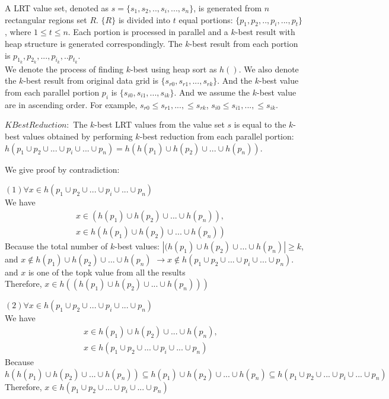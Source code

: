 \documentclass[AMA,LATO1COL]{WileyNJD-v2}
\begin{document}
A LRT value set, denoted as $s=\{s_1,s_2, .., s_i,...,s_n\}$, is generated from $n$ rectangular regions set ${R}$. $\{R\}$ is divided into $t$ equal portions: $\{p_1,p_2,..,p_i,...,p_t\}$, where $1\le t\le n$. Each portion is processed in parallel and a $k$-best result with heap structure is generated correspondingly. The $k$-best result from each portion is $p_{1_k},p_{2_k},...,p_{i_k},..p_{t_k}$.\\ We denote the process of finding $k$-best using heap sort as $h()$. We also denote the $k$-best result from original data grid is $\{s_{r0},s_{r1},...,s_{rk}\}$. And the $k$-best value from each parallel portion $p_i$ is $\{s_{i0},s_{i1},...,s_{ik}\}$. And we assume the $k$-best value are in ascending order. For example, $s_{r0}\le s_{r1},...,\le s_{rk}$, $s_{i0}\le s_{i1},...,\le s_{ik}$.
\begin{lemma}{\bf $KBestReduction:$} The $k$-best LRT values from the value set ${s}$ is equal to the $k$-best values obtained by performing $k$-best reduction from each parallel portion:
$h(p_1\cup p_2\cup ...\cup p_i \cup...\cup p_n)=h(h(p_1)\cup h(p_2)\cup ...\cup h(p_n))$.
\end{lemma}
We give proof by contradiction:

\noindent $(1)\forall x\in h(p_1\cup p_2\cup ...\cup p_i \cup...\cup p_n)$\\
We have
\vspace{-5mm}
\begin{eqnarray}
x\in (h(p_1)\cup h(p_2)\cup ...\cup h(p_n)),&\\
 x\in h(h(p_1)\cup h(p_2)\cup ...\cup h(p_n))
\end{eqnarray}
Because the total number of $k$-best values:
$|(h(p_1)\cup h(p_2)\cup ...\cup h(p_n)|\ge k$, \\
and $x \notin h(p_1)\cup h(p_2)\cup ...\cup h(p_n)$ $\rightarrow x \notin h(p_1\cup p_2\cup ...\cup p_i \cup...\cup p_n)$.\\   and $x$ is one of the topk value from all the results\\
Therefore, $x\in h((h(p_1)\cup h(p_2)\cup ...\cup h(p_n)))$

\noindent $(2) \forall x\in h(p_1\cup p_2\cup ...\cup p_i \cup...\cup p_n)$\\
We have
\vspace{-5mm}
\begin{eqnarray}
x\in h(p_1)\cup h(p_2)\cup ...\cup h(p_n),&\\
x\in h(p_1\cup p_2\cup ...\cup p_i \cup...\cup p_n)
\end{eqnarray}
Because $h(h(p_1)\cup h(p_2)\cup ...\cup h(p_n))\subseteq h(p_1)\cup h(p_2)\cup ...\cup h(p_n) \subseteq h(p_1\cup p_2\cup ...\cup p_i \cup...\cup p_n)$\\
Therefore, $x\in h(p_1\cup p_2\cup ...\cup p_i \cup...\cup p_n)$
\end{document}
